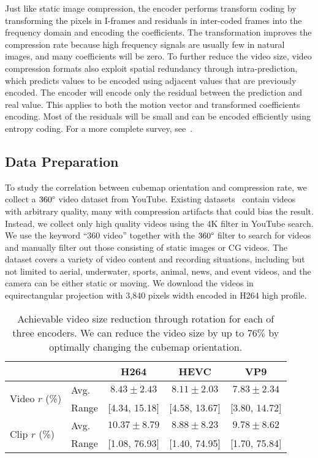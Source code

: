 \documentclass[journal,transmag]{IEEEtran}
\begin{document}
Just like static image compression, 
the encoder performs transform coding by transforming the pixels in I-frames and residuals in inter-coded frames into the frequency domain and encoding the coefficients.
The transformation improves the compression rate because high frequency signals are usually few in natural images,
and many coefficients will be zero.
To further reduce the video size,
video compression formats also exploit spatial redundancy through intra-prediction,
which predicts values to be encoded using adjacent values that are previously encoded.
The encoder will encode only the residual between the prediction and real value.
This applies to both the motion vector and transformed coefficients encoding.
Most of the residuals will be small and can be encoded efficiently using entropy coding.
For a more complete survey, see~\cite{videocompression}.


\subsection{Data Preparation}
\label{sub:data_collection}


To study the correlation between cubemap orientation and compression rate,
we collect a $360\degree$ video dataset from YouTube.
Existing datasets~\cite{su2016accv,hu2017deep} contain videos with arbitrary quality, many with 
compression artifacts that could bias the result.
Instead, we collect only high quality videos using the 4K filter in YouTube search.
We use the keyword ``360 video'' together with the $360\degree$ filter to search for videos and manually filter out those consisting of static images or CG videos.
The dataset covers a variety of video content and recording situations,
including but not limited to aerial, underwater, sports, animal, news, and event videos,
and the camera can be either static or moving.
We download the videos in equirectangular projection with 3,840 pixels width encoded in H264 high profile.

\begin{table}[t]
    \small
    \tabcolsep=0.12cm
    \center
    \begin{tabular}{llccc}
    \toprule
                                   &        & H264            & HEVC           & VP9\\
    \midrule
        \multirow{2}{*}{Video $r$ (\%)} & Avg.   & $8.43 \pm 2.43$ & $8.11 \pm 2.03$ & $7.83 \pm 2.34$\\
                                   & Range  & [4.34, 15.18]   & [4.58, 13.67]   & [3.80, 14.72]\\
    \midrule
        \multirow{2}{*}{Clip $r$ (\%)}  & Avg.   & $10.37 \pm 8.79$& $8.88 \pm 8.23$ & $9.78 \pm 8.62$\\
                                   & Range  & [1.08, 76.93]   & [1.40, 74.95]   & [1.70, 75.84]\\
    \bottomrule
    \end{tabular}
    \caption{
        Achievable video size reduction through rotation for each of three encoders.
        We can reduce the video size by up to $76\%$ by optimally changing the cubemap orientation.
    }
    \label{tab:encoders}
\end{table}
\end{document}
